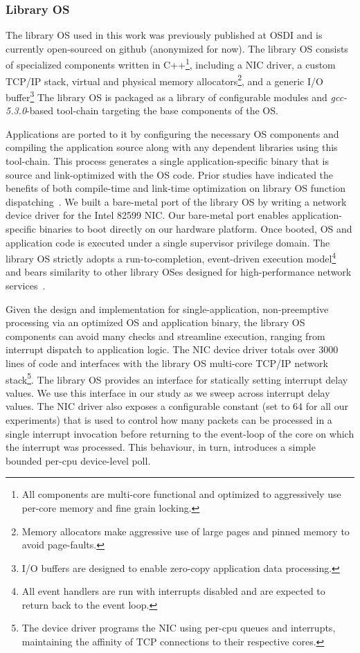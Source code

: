 \subsubsection{Library OS}
\label{sec:OS_libos}
The library OS used in this work was previously published at OSDI and is currently open-sourced on github (anonymized for now). The library OS consists of specialized components written in C++\footnote{ All components are multi-core functional and optimized to aggressively use per-core memory and fine grain locking.}, including a NIC driver, a custom TCP/IP stack, virtual and physical memory allocators\footnote{Memory allocators make aggressive use of large pages and pinned memory to avoid page-faults.}, and a generic I/O buffer\footnote{I/O buffers are designed to enable zero-copy application data processing.} The library OS is packaged as a library of configurable modules and \textit{gcc-5.3.0}-based tool-chain targeting the base components of the OS. 

Applications are ported to it by configuring the necessary OS components and compiling the application source along with any dependent libraries using this tool-chain. This process generates a single application-specific binary that is source and link-optimized with the OS code. Prior studies have indicated the benefits of both compile-time and link-time optimization on library OS function dispatching~\cite{EbbRT}. We built a bare-metal port of the library OS by writing a network device driver for the Intel 82599 NIC. Our bare-metal port enables application-specific binaries to boot directly on our hardware platform. Once booted, OS and application code is executed under a single supervisor privilege domain. The library OS strictly adopts a run-to-completion, event-driven execution model\footnote{All event handlers are run with interrupts disabled and are expected to return back to the event loop.} and bears similarity to other library OSes designed for high-performance network services~\cite{arrakis, seda, ix, EbbRT}.


Given the design and implementation for single-application, non-preemptive processing via an optimized OS and application binary, the library OS components can avoid many checks and streamline execution, ranging from interrupt dispatch to application logic. The NIC device driver totals over 3000 lines of code and interfaces with the library OS multi-core TCP/IP network stack\footnote{The device driver programs the NIC using per-cpu queues and interrupts, maintaining the affinity of TCP connections to their respective cores.}. The library OS provides an interface for statically setting interrupt delay values. We use this interface in our study as we sweep across interrupt delay values. The NIC driver also exposes a configurable constant (set to 64 for all our experiments) that is used to control how many packets can be processed in a single interrupt invocation before returning to the event-loop of the core on which the interrupt was processed. This behaviour, in turn, introduces a simple bounded per-cpu device-level poll.


